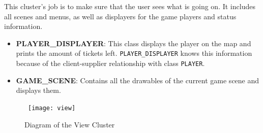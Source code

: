  This cluster's job is to make sure that the user sees what is going on. It includes all scenes and menus, as well as displayers for the game players and status information.

\begin{itemize}
  \item{\textbf{PLAYER\_DISPLAYER}: This class displays the player on the map and prints the amount of tickets left. \texttt{PLAYER\_DISPLAYER} knows this information because of the client-supplier relationship with class \texttt{PLAYER}.}
  \item{\textbf{GAME\_SCENE}: Contains all the drawables of the current game scene and displays them.}
\end{itemize}

\begin{figure}[h]
\centerline{\hbox{  
  \texttt{[image: view]}
  }}
\caption{Diagram of the View Cluster}
\label{viewdiagram}
\end{figure}
